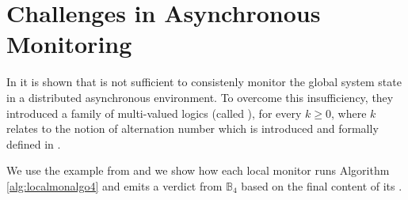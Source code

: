 \section{Challenges in Asynchronous Monitoring}
\label{sec:challenge-as}


In \cite{bfrrt16} it is shown that \RVLTL is not sufficient to consistenly monitor the global system state in a distributed asynchronous environment. To overcome this insufficiency, they introduced a family of multi-valued logics (called \LTLk), for every $k \geqslant 0$, where $k$ relates to the notion of alternation number which is introduced and formally defined in \cite{bfrrt16}.  

We use the example from \cite{bfrrt16} and we show how each local monitor runs Algorithm \ref{alg:localmonalgo4} and emits a verdict from $\mathbb{B}_4$ based on the final content of its \localreg. \\





